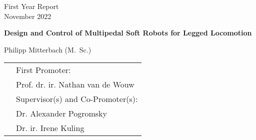 \tikzexternaldisable
{}	
\tikzexternalenable


\vspace*{20mm}

\sffamily


\begin{center}
    \LARGE
    First Year Report\\
    November 2022
\end{center}

\vspace{15mm}

\begin{center}
    \LARGE
    \bfseries
    Design and Control of Multipedal Soft Robots for Legged Locomotion
\end{center}

\vspace{3mm}

%	

\vspace{15mm}

\mdseries
\LARGE
\begin{center}  
Philipp Mitterbach (M.~Sc.)

\end{center}

\vfill

\large
\noindent
\begin{tabular}[b]{ll}
  \bfseries
  & First Promoter: \\
  \mdseries
  & Prof. dr. ir. Nathan van de Wouw\\
  & Supervisor(s) and Co-Promoter(s): \\
  & Dr. Alexander Pogromsky \\
  & Dr. ir. Irene Kuling \\
\end{tabular}

